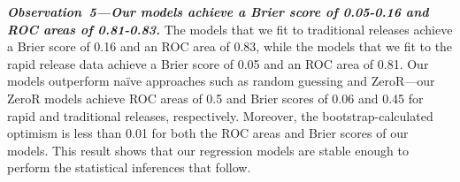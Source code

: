 \begin{sloppypar}
\noindent\textit{\textbf{Observation~5---Our models achieve a Brier score of 0.05-0.16 and ROC
areas of 0.81-0.83.}}
The models that we fit to traditional releases achieve a Brier score of 0.16 and
an ROC area of 0.83, while the models that we fit to the rapid release data
achieve a Brier score of 0.05 and an ROC area of 0.81. Our models outperform
na\"{i}ve approaches such as random guessing and ZeroR---our ZeroR models
achieve ROC areas of 0.5 and Brier scores of 0.06 and 0.45 for rapid and
traditional releases, respectively. Moreover, the bootstrap-calculated optimism
is less than 0.01 for both the ROC areas and Brier scores of our models. This
result shows that our regression models are stable enough to perform the
statistical inferences that follow.\\


\end{sloppypar}

